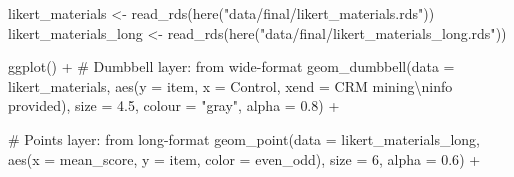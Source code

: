 \documentclass[
  letterpaper,
  DIV=11,
  numbers=noendperiod]{scrartcl}
\newenvironment{Shaded}{\begin{snugshade}}{\end{snugshade}}
\newcommand{\AttributeTok}[1]{\textcolor[rgb]{0.40,0.45,0.13}{#1}}
\newcommand{\CommentTok}[1]{\textcolor[rgb]{0.37,0.37,0.37}{#1}}
\newcommand{\DecValTok}[1]{\textcolor[rgb]{0.68,0.00,0.00}{#1}}
\newcommand{\FloatTok}[1]{\textcolor[rgb]{0.68,0.00,0.00}{#1}}
\newcommand{\FunctionTok}[1]{\textcolor[rgb]{0.28,0.35,0.67}{#1}}
\newcommand{\NormalTok}[1]{\textcolor[rgb]{0.00,0.23,0.31}{#1}}
\newcommand{\OtherTok}[1]{\textcolor[rgb]{0.00,0.23,0.31}{#1}}
\newcommand{\SpecialCharTok}[1]{\textcolor[rgb]{0.37,0.37,0.37}{#1}}
\newcommand{\StringTok}[1]{\textcolor[rgb]{0.13,0.47,0.30}{#1}}
\begin{document}
\begin{Shaded}
\begin{Highlighting}[]
\NormalTok{likert\_materials }\OtherTok{\textless{}{-}} \FunctionTok{read\_rds}\NormalTok{(}\FunctionTok{here}\NormalTok{(}\StringTok{"data/final/likert\_materials.rds"}\NormalTok{))}
\NormalTok{likert\_materials\_long }\OtherTok{\textless{}{-}} \FunctionTok{read\_rds}\NormalTok{(}\FunctionTok{here}\NormalTok{(}\StringTok{"data/final/likert\_materials\_long.rds"}\NormalTok{))}

\FunctionTok{ggplot}\NormalTok{() }\SpecialCharTok{+}
  \CommentTok{\# Dumbbell layer: from wide{-}format}
  \FunctionTok{geom\_dumbbell}\NormalTok{(}\AttributeTok{data =}\NormalTok{ likert\_materials,}
                \FunctionTok{aes}\NormalTok{(}\AttributeTok{y =}\NormalTok{ item, }\AttributeTok{x =}\NormalTok{ Control, }\AttributeTok{xend =} \StringTok{\textasciigrave{}}\AttributeTok{CRM mining}\SpecialCharTok{\textbackslash{}n}\AttributeTok{info provided}\StringTok{\textasciigrave{}}\NormalTok{),}
                \AttributeTok{size =} \FloatTok{4.5}\NormalTok{,}
                \AttributeTok{colour =} \StringTok{"gray"}\NormalTok{,}
                \AttributeTok{alpha =} \FloatTok{0.8}\NormalTok{) }\SpecialCharTok{+}
  
  \CommentTok{\# Points layer: from long{-}format}
  \FunctionTok{geom\_point}\NormalTok{(}\AttributeTok{data =}\NormalTok{ likert\_materials\_long,}
             \FunctionTok{aes}\NormalTok{(}\AttributeTok{x =}\NormalTok{ mean\_score, }\AttributeTok{y =}\NormalTok{ item, }\AttributeTok{color =}\NormalTok{ even\_odd),}
             \AttributeTok{size =} \DecValTok{6}\NormalTok{,}
             \AttributeTok{alpha =} \FloatTok{0.6}\NormalTok{) }\SpecialCharTok{+}
  

\end{Highlighting}
\end{Shaded}
\end{document}
